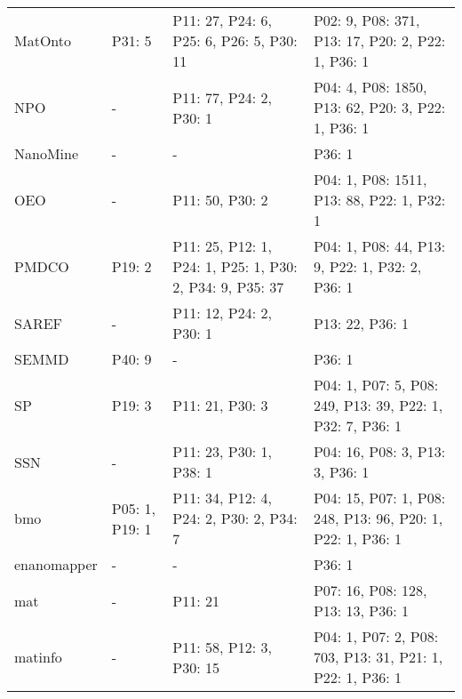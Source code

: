 \begin{table}
\begin{tabular}{m{3.5cm}m{2cm}m{2cm}m{2cm}}
                MatOnto &                  P31: 5 &                 P11: 27, P24: 6, P25: 6, P26: 5, P30: 11 &          P02: 9, P08: 371, P13: 17, P20: 2, P22: 1, P36: 1 \\
                    NPO &                       - &                                  P11: 77, P24: 2, P30: 1 &         P04: 4, P08: 1850, P13: 62, P20: 3, P22: 1, P36: 1 \\
               NanoMine &                       - &                                                        - &                                                     P36: 1 \\
                    OEO &                       - &                                          P11: 50, P30: 2 &                 P04: 1, P08: 1511, P13: 88, P22: 1, P32: 1 \\
                  PMDCO &                  P19: 2 & P11: 25, P12: 1, P24: 1, P25: 1, P30: 2, P34: 9, P35: 37 &            P04: 1, P08: 44, P13: 9, P22: 1, P32: 2, P36: 1 \\
                  SAREF &                       - &                                  P11: 12, P24: 2, P30: 1 &                                            P13: 22, P36: 1 \\
                  SEMMD &                  P40: 9 &                                                        - &                                                     P36: 1 \\
                     SP &                  P19: 3 &                                          P11: 21, P30: 3 &  P04: 1, P07: 5, P08: 249, P13: 39, P22: 1, P32: 7, P36: 1 \\
                    SSN &                       - &                                  P11: 23, P30: 1, P38: 1 &                            P04: 16, P08: 3, P13: 3, P36: 1 \\
                    bmo &          P05: 1, P19: 1 &                  P11: 34, P12: 4, P24: 2, P30: 2, P34: 7 & P04: 15, P07: 1, P08: 248, P13: 96, P20: 1, P22: 1, P36: 1 \\
            enanomapper &                       - &                                                        - &                                                     P36: 1 \\
                    mat &                       - &                                                  P11: 21 &                         P07: 16, P08: 128, P13: 13, P36: 1 \\
                matinfo &                       - &                                 P11: 58, P12: 3, P30: 15 &  P04: 1, P07: 2, P08: 703, P13: 31, P21: 1, P22: 1, P36: 1 \\

\end{tabular}
\end{table}
